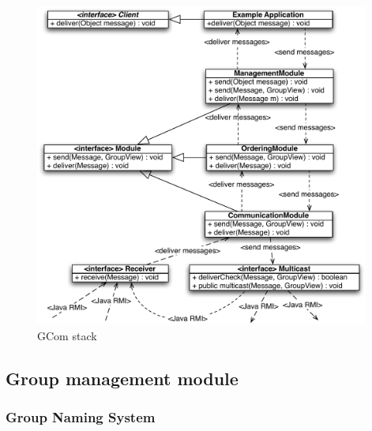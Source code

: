 \documentclass[titlepage, twocolumn, a4paper, 10pt]{article}
\begin{document}


\begin{figure}[!t]
  \centerline{\includegraphics[width=110mm]{images/Stack.pdf}}
  \caption{GCom stack}
  \label{fig:images/Stack}
\end{figure}



\subsection{Group management module}\label{sec:group-management-module}

\subsubsection{Group Naming System}\label{sec:group-naming-system}
\end{document}
